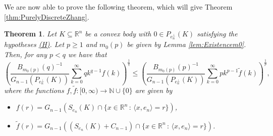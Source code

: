 \documentclass[10pt]{amsart}
\newtheorem{thm}{Theorem}[section]
\def\R{\mathbb{R}}
\def\N{\mathbb{N}}
\numberwithin{equation}{section}
\begin{document}
We are now able to prove the following theorem, which will give Theorem \ref{thm:PurelyDiscreteZhang}.

\begin{thm}\label{thm:CompletelyDiscreteBerwald}
Let $K\subseteq\R^n$ be a convex body with $0\in P_{e_n^\perp}(K)$ satisfying the hypotheses \hyperlink{(H)}{\textrm{(H)}}. Let $p\geq1$ and $m_0(p)$ be given by Lemma \ref{lem:Existencem0}. Then, for any $p<q$ we have that
$$
\left(\frac{B_{m_0(p)}(q)^{-1}}{G_{n-1}(P_{e_n^\perp}(K))}\sum_{k=0}^{\infty}qk^{q-1}f(k)\right)^\frac{1}{q}\leq \left(\frac{B_{m_0(p)}(p)^{-1}}{G_{n-1}(P_{e_n^\perp}(K))}\sum_{k=0}^{\infty}pk^{p-1}\tilde{f}(k)\right)^\frac{1}{p},
$$
where the functions $f,\tilde{f}:[0,\infty)\to\N\cup\{0\}$ are given by
\begin{itemize}
\item $f(r)=G_{n-1}(S_{e_n}(K)\cap\{x\in\R^n\,:\,\langle x,e_n\rangle=r\})$,
\item $\tilde{f}(r)=G_{n-1}((S_{e_n}(K)+C_{n-1})\cap\{x\in\R^n\,:\,\langle x,e_n\rangle=r\})$.
\end{itemize}
\end{thm}
\end{document}
